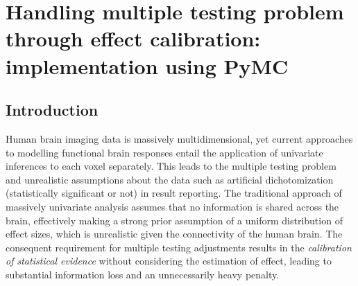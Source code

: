 \documentclass[../main.tex]{subfiles}
\begin{document}
\section{Handling multiple testing problem through effect calibration: implementation using PyMC}

\subsection{Introduction}

Human brain imaging data is massively multidimensional, yet current approaches to modelling functional brain responses entail the application of univariate inferences to each voxel separately. This leads to the multiple testing problem and unrealistic assumptions about the data such as artificial dichotomization (statistically significant or not) in result reporting. The traditional approach of massively univariate analysis assumes that no information is shared across the brain, effectively making a strong prior assumption of a uniform distribution of effect sizes, which is unrealistic given the connectivity of the human brain. The consequent requirement for multiple testing adjustments results in the \textit{calibration of statistical evidence} without considering the estimation of effect, leading to substantial information loss and an unnecessarily heavy penalty.
\end{document}
